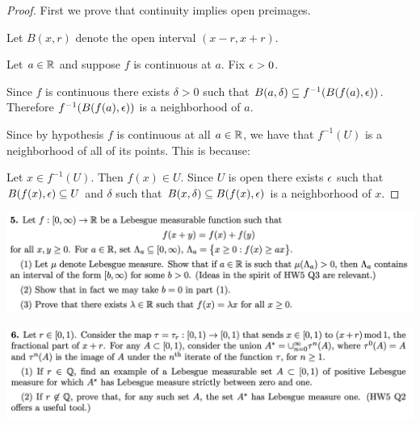 \begin{proof}
  First we prove that continuity implies open preimages.

  Let $B(x, r)$ denote the open interval $(x - r, x + r)$.

  Let $a \in \mathbb{R}$ and suppose $f$ is continuous at $a$. Fix $\epsilon > 0$.

  Since $f$ is continuous there exists $\delta > 0$ such
  that $B(a,  \delta) \subseteq f^{-1}(B(f(a), \epsilon))$. Therefore $f^{-1}(B(f(a), \epsilon))$ is a
  neighborhood of $a$.

  Since by hypothesis $f$ is continuous at all $a \in \mathbb{R}$, we have that $f^{-1}(U)$ is a neighborhood of all of
  its points. This is because:

  Let $x \in f^{-1}(U)$. Then $f(x) \in U$. Since $U$ is open there exists $\epsilon$ such
  that $B(f(x), \epsilon) \subseteq U$ and $\delta$ such that $B(x, \delta) \subseteq B(f(x), \epsilon)$ is a
  neighborhood of $x$.
\end{proof}
\newpage
\begin{mdframed}
\includegraphics[width=400pt]{img/analysis--berkeley-202a-hw06-7769.png}
\end{mdframed}


\newpage
\begin{mdframed}
\includegraphics[width=400pt]{img/analysis--berkeley-202a-hw06-9bc5.png}
\end{mdframed}